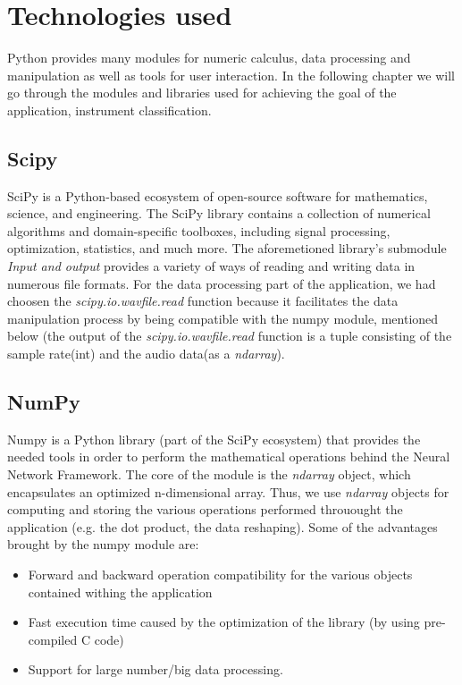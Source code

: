 \chapter{Technologies used}
Python provides many modules for numeric calculus, data processing and manipulation as  well as tools for user interaction.
In the following chapter we will go through the modules and libraries used for achieving the goal
of the application, instrument classification.

\section{Scipy}
SciPy is a Python-based ecosystem of open-source software for mathematics, science, and engineering. The SciPy library contains a collection of numerical algorithms and domain-specific toolboxes, including signal processing, optimization, statistics, and much more.\cite{scpd}
The aforemetioned library's submodule \textit{Input and output} provides a variety of ways of reading and writing data in numerous file formats. For the data processing part of the application, we had choosen the \textit{scipy.io.wavfile.read} function because it facilitates the data manipulation process by being compatible with the numpy module, mentioned below (the output of the \textit{scipy.io.wavfile.read} function is a tuple consisting of the sample rate(int) and the audio data(as a \textit{ndarray}).
\section{NumPy}
Numpy is a Python library (part of the SciPy ecosystem) that provides the needed tools in order to perform the mathematical operations behind
the Neural Network Framework. The core of the module is the \textit{ndarray} object, which encapsulates an optimized n-dimensional array. Thus, we use \textit{ndarray} objects for computing and storing the various operations performed throuought the application (e.g. the dot product, the data reshaping).
Some of the advantages brought by the numpy module are:
\begin{itemize}
	\item Forward and backward operation compatibility for the various objects contained withing the application
	\item Fast execution time caused by the optimization of the library \cite{npd} (by using pre-compiled C code)
	\item Support for large number/big data processing.
\end{itemize}

